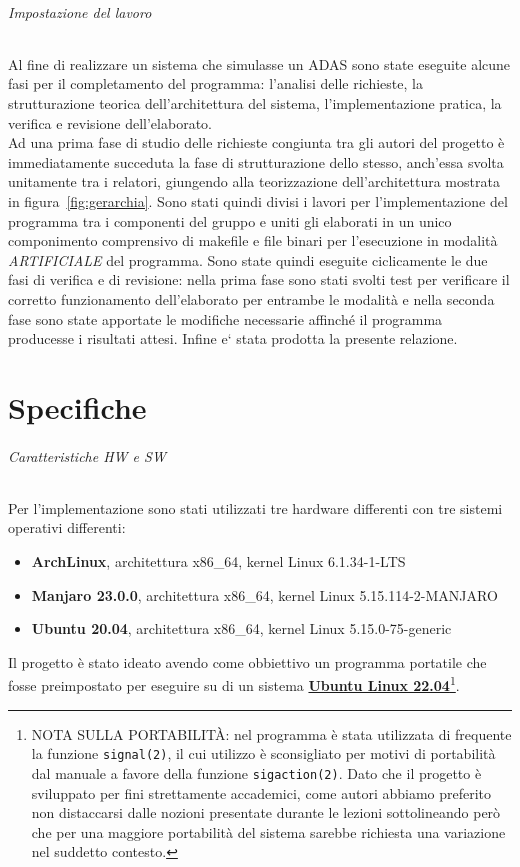 \documentclass[11pt, openany]{article}
\theoremstyle{definition}
\theoremstyle{plain}
\theoremstyle{remark}
\begin{document}
		\paragraph{Impostazione del lavoro}
			Al fine di realizzare un sistema che simulasse un ADAS sono state eseguite alcune fasi per il completamento del programma: l'analisi delle richieste, la strutturazione teorica dell'architettura del sistema, l'implementazione pratica, la verifica e revisione dell'elaborato.\\
			Ad una prima fase di studio delle richieste congiunta tra gli autori del progetto è immediatamente succeduta la fase di strutturazione dello stesso, anch'essa svolta unitamente tra i relatori, giungendo alla teorizzazione dell'architettura mostrata in figura~\ref{fig:gerarchia}. Sono stati quindi divisi i lavori per l'implementazione del programma tra i componenti del gruppo e uniti gli elaborati in un unico componimento comprensivo di makefile e file binari per l'esecuzione in modalità \textit{ARTIFICIALE} del programma. Sono state quindi eseguite ciclicamente le due fasi di verifica e di revisione: nella prima fase sono stati svolti test per verificare il corretto funzionamento dell'elaborato per entrambe le modalità e nella seconda fase sono state apportate le modifiche necessarie affinché il programma producesse i risultati attesi. Infine e` stata prodotta la presente relazione.
	\part{Specifiche}
		\paragraph{Caratteristiche HW e SW}
		Per l'implementazione sono stati utilizzati tre hardware differenti con tre sistemi operativi differenti:
		\begin{itemize}
			\item \textbf{ArchLinux}, architettura x86\_64, kernel Linux 6.1.34-1-LTS
			\item \textbf{Manjaro 23.0.0}, architettura x86\_64, kernel Linux 5.15.114-2-MANJARO
			\item \textbf{Ubuntu 20.04}, architettura x86\_64, kernel Linux 5.15.0-75-generic
		\end{itemize}
		Il progetto è stato ideato avendo come obbiettivo un programma portatile che fosse preimpostato per eseguire su di un sistema \textbf{\underline{Ubuntu Linux 22.04}}\footnote{NOTA SULLA PORTABILITÀ: nel programma è stata utilizzata di frequente la funzione \texttt{signal(2)}, il cui utilizzo è sconsigliato per motivi di portabilità dal manuale a favore della funzione \texttt{sigaction(2)}. Dato che il progetto è sviluppato per fini strettamente accademici, come autori abbiamo preferito non distaccarsi dalle nozioni presentate durante le lezioni sottolineando però che per una maggiore portabilità del sistema sarebbe richiesta una variazione nel suddetto contesto.}.
\end{document}
